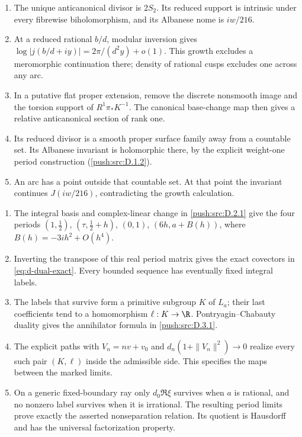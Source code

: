 \RungOne
\begin{enumerate}[label=\arabic*.]
\item The unique anticanonical divisor is $2S_2$.
Its reduced support is intrinsic under every fibrewise
biholomorphism, and its Albanese nome is $iw/216$.
\item At a reduced rational $b/d$, modular inversion
gives $\log|j(b/d+iy)|=2\pi/(d^2y)+o(1)$.
This growth excludes a meromorphic continuation there;
density of rational cusps excludes one across any arc.
\item In a putative flat proper extension, remove the
discrete nonsmooth image and the torsion support of
$R^1\pi_*K^{-1}$. The canonical base-change map then
gives a relative anticanonical section of rank one.
\item Its reduced divisor is a smooth proper surface
family away from a countable set. Its Albanese invariant
is holomorphic there, by the explicit weight-one period
construction (\ref{push:src:D.1.2}).
\item An arc has a point outside that countable set.
At that point the invariant continues $J(iw/216)$,
contradicting the growth calculation.
\end{enumerate}

\RungOne
\begin{enumerate}[label=\arabic*.]
\item The integral basis and complex-linear change in
\ref{push:src:D.2.1} give the four periods
$(1,\frac12)$, $(\tau,\frac12+h)$, $(0,1)$,
$(6h,a+B(h))$, where $B(h)=-3ih^2+O(h^4)$.
\item Inverting the transpose of this real period
matrix gives the exact covectors in
\ref{eq:d-dual-exact}. Every bounded sequence has
eventually fixed integral labels.
\item The labels that survive form a primitive subgroup
$K$ of $L_a$; their last coefficients tend to a
homomorphism $\ell:K\to\R$. Pontryagin--Chabauty
duality gives the annihilator formula in
\ref{push:src:D.3.1}.
\item The explicit paths with
$V_n=nv+v_0$ and $d_n(1+\|V_n\|^2)\to0$
realize every such pair $(K,\ell)$ inside the admissible
side. This specifies the maps between the marked limits.
\item On a generic fixed-boundary ray only
$d_0\Re\xi$ survives when $a$ is rational, and no
nonzero label survives when it is irrational. The
resulting period limits prove exactly the asserted
nonseparation relation. Its quotient is Hausdorff and
has the universal factorization property.
\end{enumerate}

